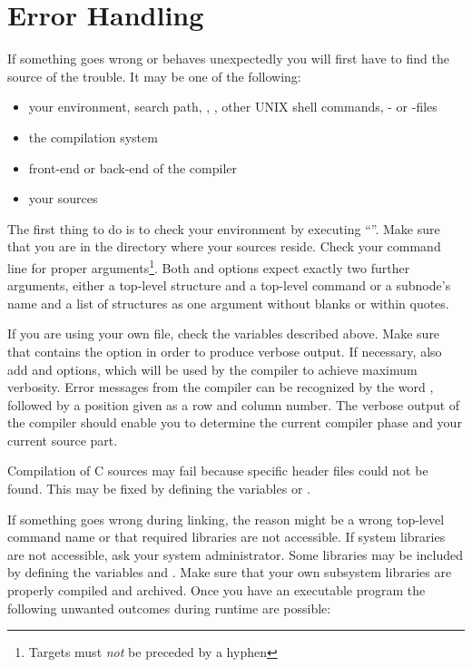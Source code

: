 \section{Error Handling}
\label{sec:errors}

If something goes wrong or behaves unexpectedly you will first have to find
the source of the trouble. It may be one of the following:

\begin{itemize}
\item your environment, search path, , , other UNIX
shell 
commands, - or -files
\item the \opal{} compilation system
\item front-end or back-end of the \opal{} compiler
\item your \opal{} sources
\end{itemize}

The first thing to do is to check your environment by executing ``''. Make sure that you are in the directory where your sources
reside. Check your  command line for proper
arguments\footnote{Targets must \emph{not} be preceded by a hyphen}. Both
 and  options expect exactly two further arguments,
either a top-level structure and a top-level command or a subnode's name and
a list of structures as one argument without blanks or within quotes. 

If you are using your own  file, check the variables described
above. Make sure that  contains the  option in order
to produce verbose output. If necessary, also add  and 
options, which will be used by the compiler to achieve maximum verbosity.
Error messages from the compiler can be recognized by the word ,
followed by a position given as a row and column number. The verbose output of
the compiler should enable you to determine the current compiler phase and
your current source part. 

Compilation of C sources may fail because specific header files could not
be found. This may be fixed by defining the variables  or 
.

If something goes wrong during linking, the reason might be a wrong top-level
command name or that required libraries are not accessible. If system libraries
are not accessible, ask your system administrator. Some libraries may be
included by defining the variables  and . 
Make sure that your own
subsystem libraries are properly compiled and archived. Once you
have an executable program the following unwanted outcomes during runtime
are possible:

